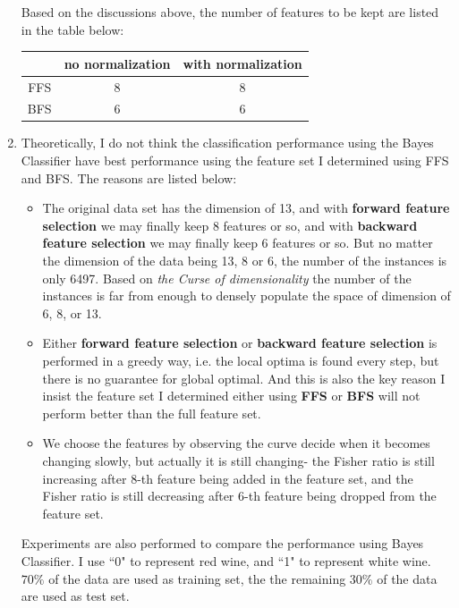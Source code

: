 \documentclass[a4paper]{article}
\begin{document}
\begin{spacing}{2.0}
\begin{enumerate}[(1)]
\begin{itemize}
\begin{enumerate}[(a)]
\end{enumerate}
\end{itemize}

Based on the discussions above, the number of features to be kept are listed in the table below:
\begin{table}[H]
\centering
\begin{tabular}{ccc}
\hline
\ \ & no normalization & with normalization\\
\hline
FFS & 8 & 8\\
BFS & 6 & 6\\
\hline
\end{tabular}
\end{table}

\item Theoretically, I do not think the classification performance using the Bayes Classifier have best performance using the feature set I determined using FFS and BFS. The reasons are listed below:
\begin{itemize}
\item The original data set has the dimension of 13, and with \textbf{forward feature selection} we may finally keep 8 features or so, and with \textbf{backward feature selection} we may finally keep 6 features or so. But no matter the dimension of the data being 13, 8 or 6, the number of the instances is only 6497. Based on \textit{the Curse of dimensionality} the number of the instances is far from enough to densely populate the space of dimension of 6, 8, or 13. 

\item Either \textbf{forward feature selection} or \textbf{backward feature selection} is performed in a greedy way, i.e. the local optima is found every step, but there is no guarantee for global optimal. And this is also the key reason I insist the feature set I determined either using \textbf{FFS} or \textbf{BFS} will not perform better than the full feature set.

\item We choose the features by observing the curve decide when it becomes changing slowly, but actually it is still changing- the Fisher ratio is still increasing after 8-th feature being added in the feature set, and the Fisher ratio is still decreasing after 6-th feature being dropped from the feature set.
\end{itemize}

Experiments are also performed to compare the performance using Bayes Classifier. I use ``0" to represent red wine, and ``1" to represent white wine. $70\%$ of the data are used as training set, the the remaining $30\%$ of the data are used as test set.


\end{enumerate}
\end{spacing}
\end{document}
